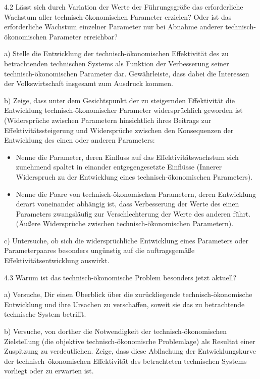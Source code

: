 \documentclass[12pt,a4paper]{article}
\begin{document}
4.2 Lässt sich durch Variation der Werte der Führungsgröße das erforderliche
Wachstum aller technisch-ökonomischen Parameter erzielen? Oder ist das
erforderliche Wachstum einzelner Parameter nur bei Abnahme anderer
technisch-ökonomischen Parameter erreichbar?

a) Stelle die Entwicklung der technisch-ökonomischen Effektivität des zu
betrachtenden technischen Systems als Funktion der Verbesserung seiner
technisch-ökonomischen Parameter dar. Gewährleiste, dass dabei die Interessen
der Volkswirtschaft insgesamt zum Ausdruck kommen.

b) Zeige, dass unter dem Gesichtspunkt der zu steigernden Effektivität die
Entwicklung technisch-ökonomischer Parameter widersprüchlich geworden ist
(Widersprüche zwischen Parametern hinsichtlich ihres Beitrags zur
Effektivitätssteigerung und Widersprüche zwischen den Konsequenzen der
Entwicklung des einen oder anderen Parameters:
\begin{itemize}
\item Nenne die Parameter, deren Einfluss auf das Effektivitätswachstum sich
  zunehmend spaltet in einander entgegengesetzte Einflüsse (Innerer Widerspruch
  zu der Entwicklung eines technisch-ökonomischen Parameters).
\item Nenne die Paare von technisch-ökonomischen Parametern, deren Entwicklung
  derart voneinander abhängig ist, dass Verbesserung der Werte des einen
  Parameters zwangsläufig zur Verschlechterung der Werte des anderen
  führt. (Äußere Widersprüche zwischen technisch-ökonomischen Parametern).
\end{itemize}

c) Untersuche, ob sich die widersprüchliche Entwicklung eines Parameters oder
Parameterpaares besonders ungünstig auf die auftragsgemäße
Effektivitätsentwicklung auswirkt.

4.3  Warum ist das technisch-ökonomische Problem besonders jetzt aktuell?

a) Versuche, Dir einen Überblick über die zurückliegende technisch-ökonomische
Entwicklung und ihre Ursachen zu verschaffen, soweit sie das zu betrachtende
technische System betrifft.

b) Versuche, von dorther die Notwendigkeit der technisch-ökonomischen
Zielstellung (die objektive technisch-ökonomische Problemlage) als Resultat
einer Zuspitzung zu verdeutlichen.  Zeige, dass diese Abflachung der
Entwicklungskurve der technisch–ökonomischen Effektivität des betrachteten
technischen Systems vorliegt oder zu erwarten ist.
\end{document}
